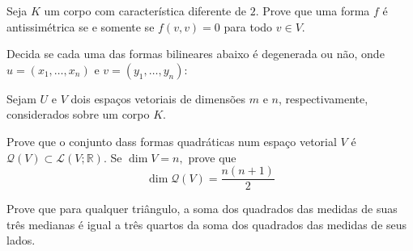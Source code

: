 \documentclass[11pt,a4paper]{article}
\begin{document}
\begin{exercicio}
Seja $K$ um corpo com característica diferente de $2.$ Prove que uma forma $f$ é antissimétrica se e somente se $f(v,v) = 0$ para todo $v \in V.$
\end{exercicio}
\begin{exercicio}
Decida se cada uma das formas bilineares abaixo é degenerada ou não, onde $u = (x_1, \ldots, x_n)$ e $v = (y_1, \ldots, y_n):$
\end{exercicio}
\solucao{}
\begin{exercicio}
Sejam $U$ e $V$ dois espaços vetoriais de dimensões $m$ e $n$, respectivamente, considerados sobre um corpo $K.$ 
\end{exercicio}
\solucao{}
\begin{exercicio}
Prove que o conjunto dass formas quadráticas num espaço vetorial $V$ é $\mathcal{Q}(V) \subset \mathcal{L}(V; \mathbb{R}).$ Se $\dim V = n,$ prove que
\[
\dim \mathcal{Q}(V) = \frac{n(n+1)}{2}
\]
\end{exercicio}
\begin{exercicio} Prove que para qualquer triângulo, a soma dos quadrados das medidas de suas três medianas é igual a três quartos da soma dos quadrados das medidas de seus lados.
\end{exercicio}
\solucao{}
\end{document}
